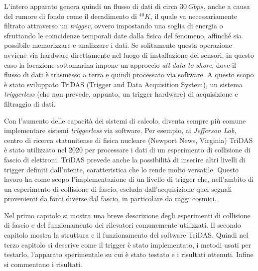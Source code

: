 \documentclass[../main.tex]{subfiles}
\begin{document}
L'intero apparato genera quindi un flusso di dati di circa $30\ Gbps$, anche a causa del rumore di fondo come il decadimento di ${}^{40}K$, il quale va necessariamente filtrato attraverso un \emph{trigger}, ovvero impostando una soglia di energia o sfruttando le coincidenze temporali date dalla fisica del fenomeno, affinché sia possibile memorizzare e analizzare i dati. Se solitamente questa operazione avviene via hardware direttamente nel luogo di installazione dei sensori, in questo caso la locazione sottomarina impone un approccio \emph{all-data-to-shore}, dove il flusso di dati è trasmesso a terra e quindi processato via software. A questo scopo è stato sviluppato TriDAS (Trigger and Data Acquisition System), un sistema \emph{triggerless} (che non prevede, appunto, un trigger hardware) di acquisizione e filtraggio di dati.

Con l'aumento delle capacità dei sistemi di calcolo, diventa sempre più comune implementare sistemi \emph{triggerless} via software. Per esempio, ai \emph{Jefferson Lab}, centro di ricerca statunitense di fisica nucleare (Newport News, Virginia) TriDAS è stato utilizzato nel 2020 per processare i dati di un esperimento di collisione di fascio di elettroni. TriDAS prevede anche la possibilità di inserire altri livelli di trigger definiti dall'utente, caratteristica che lo rende molto versatile. Questo lavoro ha come scopo l'implementazione di un livello di trigger che, nell'ambito di un esperimento di collisione di fascio, escluda dall'acquisizione quei segnali provenienti da fonti diverse dal fascio, in particolare da raggi cosmici.

Nel primo capitolo si mostra una breve descrizione degli esperimenti di collisione di fascio e del funzionamento dei rilevatori comunemente utilizzati.
Il secondo capitolo mostra la struttura e il funzionamento del software TriDAS.
Quindi nel terzo capitolo si descrive come il trigger è stato implementato, i metodi usati per testarlo, l'apparato sperimentale su cui è stato testato e i risultati ottenuti.
Infine si commentano i risultati.
\end{document}
